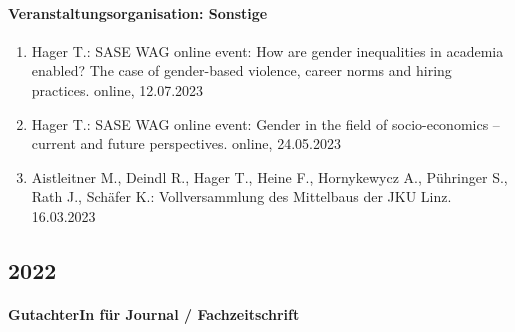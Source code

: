 \paragraph{Veranstaltungsorganisation: Sonstige}
\begin{enumerate}[leftmargin=*, labelsep=0.5cm]
\item Hager T.: SASE WAG online event: How are gender inequalities in academia enabled? The case of gender-based violence, career norms and hiring practices. online, 12.07.2023
\item Hager T.: SASE WAG online event: Gender in the field of socio-economics – current and future perspectives. online, 24.05.2023
\item Aistleitner M., Deindl R., Hager T., Heine F., Hornykewycz A., Pühringer S., Rath J., Schäfer K.: Vollversammlung des Mittelbaus der JKU Linz. 16.03.2023
\end{enumerate}\subsection*{2022}\paragraph{GutachterIn für Journal / Fachzeitschrift}
